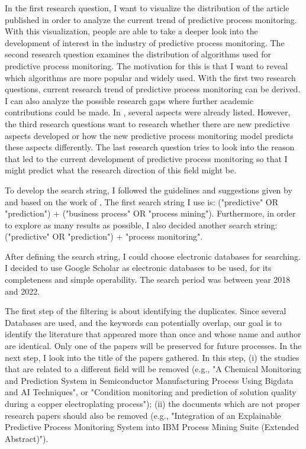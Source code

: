 \documentclass[runningheads]{llncs}
\begin{document}
		In the first research question, I want to visualize the distribution of the article published in order to analyze the current trend of predictive process monitoring. With this visualization, people are able to take a deeper look into the development of interest in the industry of predictive process monitoring. The second research question examines the distribution of algorithms used for predictive process monitoring. The motivation for this is that I want to reveal which algorithms are more popular and widely used. With the first two research questions, current research trend of predictive process monitoring can be derived. I can also analyze the possible research gaps where further academic contributions could be made. In \cite{original}, several aspects were already listed. However, the third research questions want to research whether there are new predictive aspects developed or how the new predictive process monitoring model predicts these aspects differently. The last research question tries to look into the reason that led to the current development of predictive process monitoring so that I might predict what the research direction of this field might be.
		
		To develop the search string, I followed the guidelines and suggestions given by \cite{guidline} and based on the work of \cite{original}, The first search string I use is: ("predictive" OR "prediction") + ("business process" OR "process mining"). Furthermore, in order to explore as many results as possible, I also decided another search string: ("predictive" OR "prediction") + "process monitoring". 
		
		After defining the search string, I could choose electronic databases for searching. I decided to use Google Scholar as electronic databases to be used, for its completeness and simple operability. The search period was between year 2018 and 2022.
		
		The first step of the filtering is about identifying the duplicates. Since several Databases are used, and the keywords can potentially overlap, our goal is to identify the literature that appeared more than once and whose name and author are identical. Only one of the papers will be preserved for future processes. In the next step, I look into the title of the papers gathered. In this step, (i) the studies that are related to a different field will be removed (e.g., "A Chemical Monitoring and Prediction System in Semiconductor Manufacturing Process Using Bigdata and AI Techniques", or "Condition monitoring and prediction of solution quality during a copper electroplating process"); (ii) the documents which are not proper research papers should also be removed (e.g., "Integration of an Explainable Predictive Process Monitoring System into IBM Process Mining Suite (Extended Abstract)").
				
\end{document}
